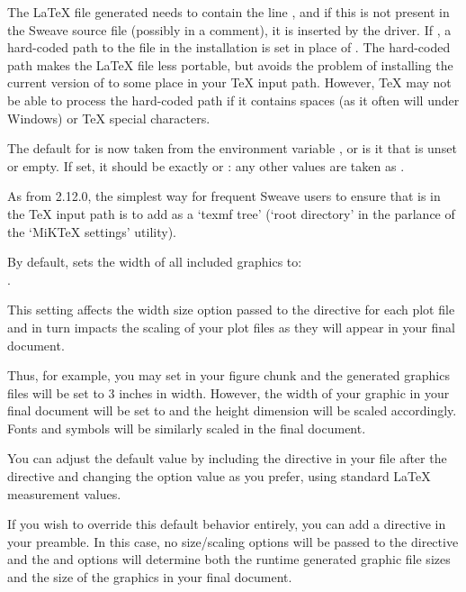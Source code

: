 \begin{Details}\relax
The LaTeX file generated needs to contain the line
, and if this is not present in the
Sweave source file (possibly in a comment), it is inserted by the
 driver.  If , a hard-coded
path to the file  in the \R{} installation is set in
place of .  The hard-coded path makes the LaTeX file less
portable, but avoids the problem of installing the current version of
 to some place in your TeX input path.  However, TeX
may not be able to process the hard-coded path if it contains spaces
(as it often will under Windows) or TeX special characters.

The default for  is now taken from the environment
variable , or is  it that is
unset or empty.  If set, it should be exactly  or
: any other values are taken as .

As from \R{} 2.12.0, the simplest way for frequent Sweave users to ensure
that  is in the TeX input path is to add
 as a `texmf tree' (`root
directory' in the parlance of the `MiKTeX settings' utility).

By default,  sets the width of all included graphics to:\\{}
.

This setting affects the width size option passed to the
 directive for each plot file and in turn
impacts the scaling of your plot files as they will appear in your
final document.

Thus, for example, you may set  in your figure chunk and
the generated graphics files will be set to 3 inches in
width.  However, the width of your graphic in your final document will
be set to  and the height dimension will be
scaled accordingly.  Fonts and symbols will be similarly scaled in the
final document. 

You can adjust the default value by including the
 directive in your  file
after the  directive and changing the
 option value as you prefer, using standard LaTeX
measurement values.

If you wish to override this default behavior entirely, you can add a
 directive in your preamble.  In this
case, no size/scaling options will be passed to the
 directive and the  and
 options will determine both the runtime generated graphic
file sizes and the size of the graphics in your final document.


\end{Details}
